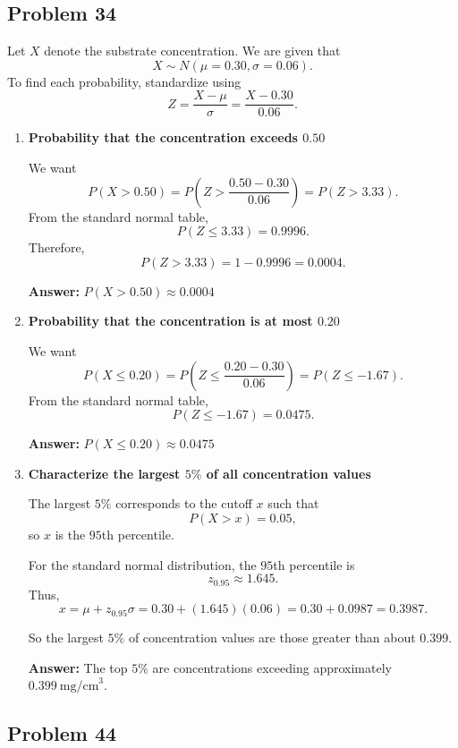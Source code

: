 \documentclass[11pt]{article}
\begin{document}
\subsection*{Problem 34}

Let $X$ denote the substrate concentration. We are given that
\[
X \sim N(\mu=0.30,\sigma=0.06).
\]
To find each probability, standardize using
\[
Z=\frac{X-\mu}{\sigma}=\frac{X-0.30}{0.06}.
\]

\begin{enumerate}
    \item[(a)] \textbf{Probability that the concentration exceeds $0.50$}

    We want
    \[
    P(X>0.50)=P\left(Z>\frac{0.50-0.30}{0.06}\right)
    =P(Z>3.33).
    \]
    From the standard normal table,
    \[
    P(Z\le 3.33)=0.9996.
    \]
    Therefore,
    \[
    P(Z>3.33)=1-0.9996=0.0004.
    \]

    \textbf{Answer:} $P(X>0.50)\approx 0.0004$

    \item[(b)] \textbf{Probability that the concentration is at most $0.20$}

    We want
    \[
    P(X\le 0.20)=P\left(Z\le \frac{0.20-0.30}{0.06}\right)
    =P(Z\le -1.67).
    \]
    From the standard normal table,
    \[
    P(Z\le -1.67)=0.0475.
    \]

    \textbf{Answer:} $P(X\le 0.20)\approx 0.0475$

    \item[(c)] \textbf{Characterize the largest $5\%$ of all concentration values}

    The largest $5\%$ corresponds to the cutoff $x$ such that
    \[
    P(X>x)=0.05,
    \]
    so $x$ is the $95$th percentile.

    For the standard normal distribution, the $95$th percentile is
    \[
    z_{0.95}\approx 1.645.
    \]
    Thus,
    \[
    x=\mu+z_{0.95}\sigma
    =0.30+(1.645)(0.06)
    =0.30+0.0987
    =0.3987.
    \]

    So the largest $5\%$ of concentration values are those greater than about $0.399$.

    \textbf{Answer:} The top $5\%$ are concentrations exceeding approximately $0.399\ \text{mg/cm}^3$.
\end{enumerate}

\subsection*{Problem 44}
\end{document}
